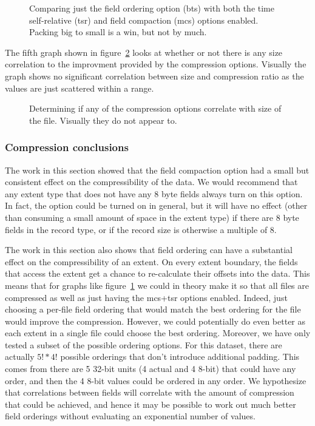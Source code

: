 \begin{figure}
\caption{Comparing just the field ordering option (bts) with both the
time self-relative (tsr) and field compaction (mcs) options enabled.
Packing big to small is a win, but not by much.}
\label{fig:wc1998:ds-opts-3}
\end{figure}

The fifth graph shown in figure~\ref{fig:wc1998:ds-size-cmp} looks at
whether or not there is any size correlation to the improvment
provided by the compression options.  Visually the graph shows no
significant correlation between size and compression ratio as the
values are just scattered within a range.

\begin{figure}
\caption{Determining if any of the compression options correlate with
size of the file.  Visually they do not appear to.}
\label{fig:wc1998:ds-size-cmp}
\end{figure}

\subsubsection{Compression conclusions}

The work in this section showed that the field compaction option had a
small but consistent effect on the compressibility of the data.  We
would recommend that any extent type that does not have any 8 byte
fields always turn on this option.  In fact, the option could be
turned on in general, but it will have no effect (other than consuming
a small amount of space in the extent type) if there are 8 byte fields
in the record type, or if the record size is otherwise a multiple of
8.

The work in this section also shows that field ordering can have a
substantial effect on the compressibility of an extent.  On every
extent boundary, the fields that access the extent get a chance to
re-calculate their offsets into the data.  This means that for graphs
like figure~\ref{fig:wc1998:ds-opts-3} we could in theory make it so
that all files are compressed as well as just having the mcs+tsr
options enabled.  Indeed, just choosing a per-file field ordering that
would match the best ordering for the file would improve the
compression.  However, we could potentially do even better as each
extent in a single file could choose the best ordering.  Moreover, we
have only tested a subset of the possible ordering options.  For this
dataset, there are actually $5!*4!$ possible orderings that don't
introduce additional padding.  This comes from there are 5 32-bit
units (4 actual and 4 8-bit) that could have any order, and then the 4
8-bit values could be ordered in any order.  We hypothesize that
correlations between fields will correlate with the amount of
compression that could be achieved, and hence it may be possible to
work out much better field orderings without evaluating an exponential
number of values.

